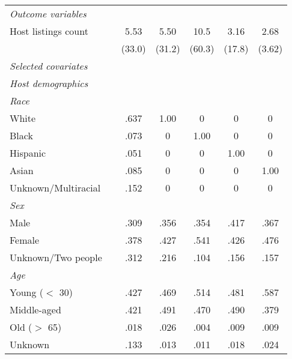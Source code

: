 {\begin{longtable}{l*{6}{c}}
		\textit{Outcome variables} \\
		Host listings count         & &      5.53&      5.50 &      10.5&    3.16 & 2.68\\
		&	&     (33.0)         &     (31.2)         &     (60.3)         &     (17.8) & 	(3.62)         \\
		[1em]
		\textit{Selected covariates} \\
		\hline\hline
		\textit{Host demographics} \\
		\hline
		\textit{Race} \\
		White     & &      .637         &       1.00         &      0         &      0 	& 		0         \\
		Black     &  &    .073       &       0         &      1.00         &      0 	& 		0         \\
		Hispanic     & &      .051         &       0         &      0         &      1.00 	& 		0         \\
		Asian     &   &   .085      &       0         &      0         &      0 	& 		1.00         \\
		Unknown/Multiracial     & &      .152         &       0         &      0         &      0 	& 		0         \\
		[1em]
		\textit{Sex} \\
		Male     & &      .309         &       .356         &      .354         &      .417 	& 		.367        \\
		Female     & &      .378         &       .427        &      .541         &      .426 	& 		.476         \\
		Unknown/Two people   &  &      .312         &       .216         &      .104         &      .156 	& 		.157         \\
		[1em]
		\textit{Age} \\
		Young ($<$ 30)     & &      .427         &       .469         &      .514        &      .481 	& 		.587         \\
		Middle-aged     & &      .421         &       .491        &      .470         &      .490 		& 		.379         \\
		Old ($>$ 65)     & &      .018         &       .026         &      .004         &      .009	& 		.009         \\
		Unknown    &  &      .133         &       .013         &      .011         &      .018 	& 		.024         \\
		[1em]
	

\end{longtable}}
